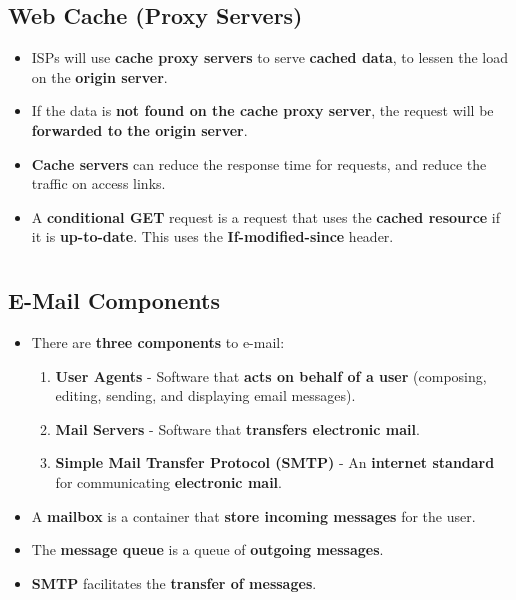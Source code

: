\documentclass{article}
\begin{document}
    \subsection*{Web Cache (Proxy Servers)}
    \begin{itemize}
        \item ISPs will use \textbf{cache proxy servers} to serve \textbf{cached data}, to lessen the load on the \textbf{origin server}.
        \item If the data is \textbf{not found on the cache proxy server}, the request will be \textbf{forwarded to the origin server}.
        \item \textbf{Cache servers} can reduce the response time for requests, and reduce the traffic on access links.
        \item A \textbf{conditional GET} request is a request that uses the \textbf{cached resource} if it is \textbf{up-to-date}. This uses the \textbf{If-modified-since} header.
    \end{itemize}

    \section*{}

    \subsection*{E-Mail Components}
    \begin{itemize}
        \item There are \textbf{three components} to e-mail:
        \begin{enumerate}
            \item \textbf{User Agents} - Software that \textbf{acts on behalf of a user} (composing, editing, sending, and displaying email messages).
            \item \textbf{Mail Servers} - Software that \textbf{transfers electronic mail}.
            \item \textbf{Simple Mail Transfer Protocol (SMTP)} - An \textbf{internet standard} for communicating \textbf{electronic mail}.
        \end{enumerate}
        \item A \textbf{mailbox} is a container that \textbf{store incoming messages} for the user.
        \item The \textbf{message queue} is a queue of \textbf{outgoing messages}.
        \item \textbf{SMTP} facilitates the \textbf{transfer of messages}.
    \end{itemize}
\end{document}
